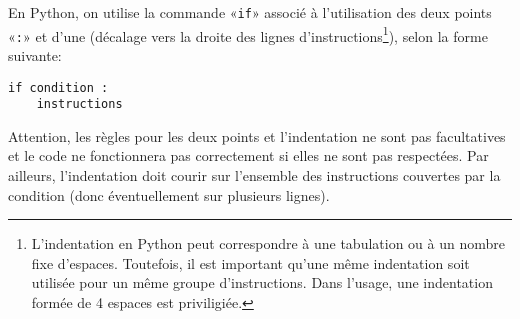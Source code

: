 En Python, on utilise la commande «\texttt{if}» associé à l'utilisation des deux points «\texttt{:}» et d'une  (décalage vers la droite des lignes d'instructions\footnote{L'indentation en Python peut correspondre à une tabulation ou à un nombre fixe d'espaces. Toutefois, il est important qu'une même indentation soit utilisée pour un même groupe d'instructions. Dans l'usage, une indentation formée de 4 espaces est priviligiée.}), selon la forme suivante:
\begin{center}
	\begin{varwidth}[t]{.5\textwidth}
		\begin{lstlisting}[language=iPython,linewidth = 5cm]
if condition :
    instructions
\end{lstlisting}\end{varwidth}\end{center}
Attention, les règles pour les deux points et l'indentation ne sont pas facultatives et le code ne fonctionnera pas correctement si elles ne sont pas respectées. Par ailleurs, l'indentation doit courir sur l'ensemble des instructions couvertes par la condition (donc éventuellement sur plusieurs lignes).


